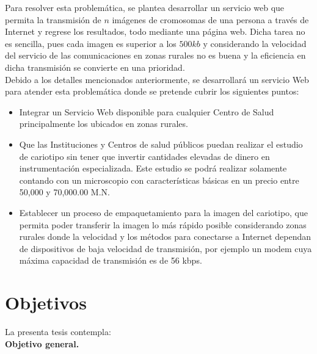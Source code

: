 \documentclass[12pt,letterpaper,titlepage]{article}
\begin{document}
Para resolver esta problemática, se plantea desarrollar un servicio web que permita la transmisión de $n$ imágenes de cromosomas de una persona a través de Internet y regrese los resultados, todo mediante una página web. Dicha tarea no es sencilla, pues cada imagen es superior a los $500kb$ y considerando la velocidad del servicio de las comunicaciones en zonas rurales no es buena y la eficiencia en dicha transmisión se convierte en una prioridad.\\

Debido a los detalles mencionados anteriormente, se desarrollará un servicio Web para atender esta problemática donde se pretende cubrir los siguientes puntos:\\


\begin{itemize}  %
\item  Integrar un Servicio Web disponible para cualquier Centro de Salud principalmente los ubicados en zonas rurales.
\item  Que las Instituciones y Centros de salud públicos puedan realizar el estudio de cariotipo sin tener que invertir cantidades elevadas de dinero en instrumentación especializada. Este estudio se podrá realizar solamente contando con un microscopio con características básicas en un precio entre 50,000 y 70,000.00 M.N.
\item  Establecer un proceso de empaquetamiento para la imagen del cariotipo, que permita poder transferir la imagen lo más rápido posible considerando zonas rurales donde la velocidad y los métodos para conectarse a Internet dependan de dispositivos de baja velocidad de transmisión, por ejemplo un modem cuya máxima capacidad de transmisión es de 56 kbps.
\end{itemize}



\section{Objetivos}\label{objetivos}

La presenta tesis contempla:\\

\textbf{Objetivo general.}\\
\end{document}
